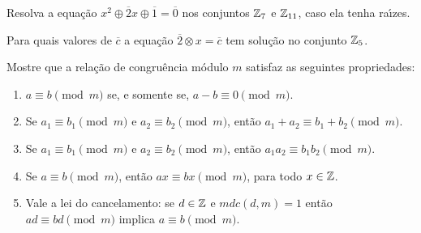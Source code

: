 \documentclass[12pt]{exam}
\begin{document}
\vspace{.3cm}

\questao{} Resolva a equa\c{c}\~ao $x^2 \oplus \overline{2}x \oplus \overline{1} = \overline{0}$ nos conjuntos $\mathbb{Z}_7$ e $\mathbb{Z}_{11}$, caso ela tenha ra{\'\i}zes.

\vspace{.3cm}

\questao{} Para quais valores de $\overline{c}$ a equa\c{c}\~ao $\overline{2}\otimes x = \overline{c}$ tem solu\c{c}\~ao no conjunto $\mathbb{Z}_5$.

\vspace{.3cm}

\questao{} Mostre que a rela{\c c}{\~a}o de congru{\^e}ncia m{\'o}dulo $m$ satisfaz as seguintes propriedades:
\begin{enumerate}[label=({\alph*})]
    \item $a\equiv b\pmod{m}$ se, e somente se, $a - b\equiv 0\pmod{m}$.
    \item Se $a_{1}\equiv b_{1}\pmod{m}$ e $a_{2}\equiv b_{2}\pmod{m}$, ent{\~a}o $a_{1}+a_{2}\equiv b_{1}+b_{2}\pmod{m}$.
    \item Se $a_{1}\equiv b_{1}\pmod{m}$ e $a_{2}\equiv b_{2}\pmod{m}$, ent{\~a}o $a_{1}a_{2}\equiv b_{1}b_{2}\pmod{m}$.\label{item_provado}
    \item Se $a\equiv b\pmod{m}$, ent{\~a}o $ax\equiv bx\pmod{m}$, para todo $x \in \mathbb{Z}$.
    \item Vale a lei do cancelamento: se $d \in \mathbb{Z}$ e $mdc(d,m) = 1$ ent{\~a}o $ad \equiv bd \pmod{m}$ implica $a\equiv b \pmod{m}$.
\end{enumerate}
\end{document}
